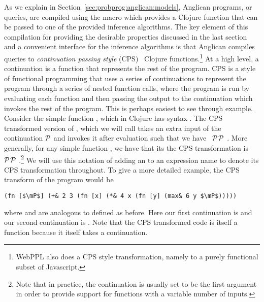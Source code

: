 As we explain in Section~\ref{sec:probprog:anglican:models},
Anglican programs, or queries, are compiled using the macro \query which provides a
Clojure function that can be passed to one of the provided inference algorithms.
The key element of this compilation for providing the desirable properties discussed
in the last section and a convenient interface for the inference algorithms is that
Anglican compiles queries to \emph{continuation passing style} (CPS)~\citep{appel1989continuation}
Clojure functions.\footnote{WebPPL also does a CPS style transformation, 
	namely to a purely functional subset of Javascript.}
At a high level, a continuation is a function that represents the rest of the
program.  CPS is a style of functional programming that uses a series of continuations
to represent the program through a series of nested function calls, where the program
is run by evaluating each function and then passing the output to the continuation
which invokes the rest of the program.  This is perhaps easiest to see through
example.  Consider the simple function \clj{+}, which in Clojure has syntax .  The
CPS transformed version of \clj{+}, which we will call \clj{+&} takes an extra input
of the continuation $\mathcal{P}$ and invokes it after evaluation such that we have
\clj{(defn +& [a b } ~$\mathcal{P}$\clj{] (}$\mathcal{P}$ .  More generally, for any simple function , we have
that its the CPS transformation is \clj{(defn f& [args} ~$\mathcal{P}$\clj{] (}$\mathcal{P}$ .\footnote{Note that
	in practice, the continuation is usually set to be the first argument in order to provide support
	for functions with a variable number of inputs.}
  We 
will use this notation of adding an \clj{&} to an expression name to denote its CPS transformation throughout.
To give a more detailed example, the CPS transform of the program  would be
\begin{lstlisting}[basicstyle=\ttfamily\small,frame=none]
  (fn [$\mP$] (+& 2 3 (fn [x] (*& 4 x (fn [y] (max& 6 y $\mP$)))))
\end{lstlisting}\vspace{-8pt}
where \clj{*&} and
 are analogous to \clj{+&} defined as before.
Here our first continuation is  and our second continuation 
is .  Note that the CPS transformed code is itself a function because
it itself takes a continuation.  

